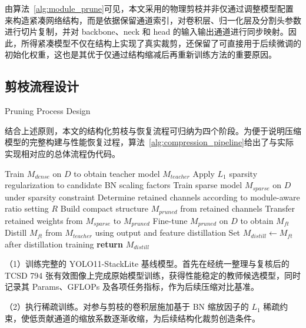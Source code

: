 由算法~\ref{alg:module_prune}可见，本文采用的物理剪枝并非仅通过调整模型配置来构造紧凑网络结构，而是依据保留通道索引，对卷积层、归一化层及分割头参数进行切片复制，并对 backbone、neck 和 head 的输入输出通道进行同步映射。因此，所得紧凑模型不仅在结构上实现了真实裁剪，还保留了可直接用于后续微调的初始化权重，这也是其优于仅通过结构缩减后再重新训练方法的重要原因。

\subsection{剪枝流程设计}{Pruning Process Design}

结合上述原则，本文的结构化剪枝与恢复流程可归纳为四个阶段。为便于说明压缩模型的完整构建与性能恢复过程，算法~\ref{alg:compression_pipeline}给出了与实际实现相对应的总体流程伪代码。

\begin{algorithm}[htbp]
\caption{CompressionDistillationPipeline}
\label{alg:compression_pipeline}
\footnotesize
{}
Train $M_{dense}$ on $D$ to obtain teacher model $M_{teacher}$
Apply $L_1$ sparsity regularization to candidate BN scaling factors
Train sparse model $M_{sparse}$ on $D$ under sparsity constraint
Determine retained channels according to module-aware ratio setting $R$
Build compact structure $M_{pruned}$ from retained channels
Transfer retained weights from $M_{sparse}$ to $M_{pruned}$
Fine-tune $M_{pruned}$ on $D$ to obtain $M_{ft}$
Distill $M_{ft}$ from $M_{teacher}$ using output and feature distillation
Set $M_{distill} \leftarrow M_{ft}$ after distillation training
\textbf{return} $M_{distill}$
\end{algorithm}

\par\noindent
（1）训练完整的 YOLO11-StackLite 基线模型。首先在经统一整理与复核后的 TCSD 794 张有效图像上完成原始模型训练，获得性能稳定的教师候选模型，同时记录其 Params、GFLOPs 及各项任务指标，作为后续压缩对比基准。

\par\noindent
（2）执行稀疏训练。对参与剪枝的卷积层施加基于 BN 缩放因子的 $L_1$ 稀疏约束，使低贡献通道的缩放系数逐渐收缩，为后续结构化裁剪创造条件。

